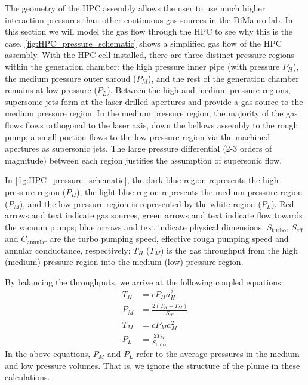 The geometry of the HPC assembly allows the user to use much higher interaction pressures than other continuous gas sources in the DiMauro lab. In this section we will model the gas flow through the HPC to see why this is the case. \cref{fig:HPC_pressure_schematic} shows a simplified gas flow of the HPC assembly. With the HPC cell installed, there are three distinct pressure regions within the generation chamber: the high pressure inner pipe (with pressure $P_H$), the medium pressure outer shroud ($P_M$), and the rest of the generation chamber remains at low pressure ($P_L$). Between the high and medium pressure regions, supersonic jets form at the laser-drilled apertures and provide a gas source to the medium pressure region. In the medium pressure region, the majority of the gas flows flows orthogonal to the laser axis, down the bellows assembly to the rough pump; a small portion flows to the low pressure region via the machined apertures as supersonic jets. The large pressure differential (2-3 orders of magnitude) between each region justifies the assumption of supersonic flow.

In \cref{fig:HPC_pressure_schematic}, the dark blue region represents the high pressure region ($P_H$), the light blue region represents the medium pressure region ($P_M$), and the low pressure region is represented by the white region ($P_L$). Red arrows and text indicate gas sources, green arrows and text indicate flow towards the vacuum pumps; blue arrows and text indicate physical dimensions. $S_{\textrm{turbo}}$, $S_{\textrm{eff}}$ and $C_{\textrm{annular}}$ are the turbo pumping speed, effective rough pumping speed and annular conductance, respectively; $T_H$ ($T_M$) is the gas throughput from the high (medium) pressure region into the medium (low) pressure region.

By balancing the throughputs, we arrive at the following coupled equations:
\begin{equation}
\begin{aligned}
T_H &= c P_H a_H^2 \\
P_M &= \frac{2(T_H-T_M)}{S_{\textrm{eff}}} \\
T_M &= c P_M a_M^2 \\
P_L &= \frac{2 T_M}{S_{\textrm{turbo}}}
\end{aligned}
\label{eqn:HPC-coupled-equations}
\end{equation}
In the above equations, $P_M$ and $P_L$ refer to the average pressures in the medium and low pressure volumes. That is, we ignore the structure of the plume in these calculations.

